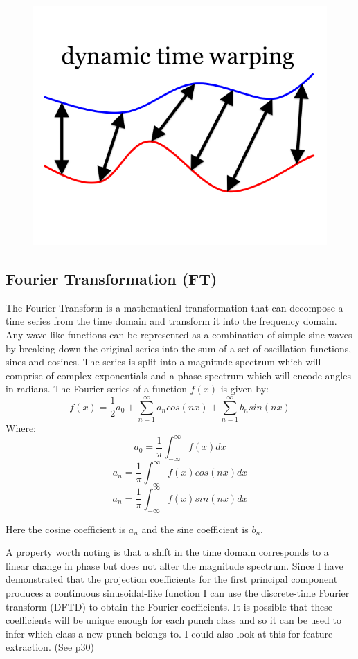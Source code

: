 \begin{figure}[h]
    \centering
    \includegraphics[height=0.25\textheight]{fig02/dtw}
    \label{fig:kinect}
\end{figure}


\subsection{Fourier Transformation (FT)}
The Fourier Transform is a mathematical transformation that can decompose a time series from the time domain and transform it into the frequency domain. Any wave-like functions can be represented as a combination of simple sine waves by breaking down the original series into the sum of a set of oscillation functions, sines and cosines. The series is split into a magnitude spectrum which will comprise of complex exponentials and a phase spectrum which will encode angles in radians. 
The Fourier series of a function $f(x)$ is given by:
$$f(x)=\frac{1}{2}a_0 + \sum_{n=1}^\infty a_n cos(nx) + \sum_{n=1}^\infty b_n sin(nx)$$
Where:
$$a_0 = \frac{1}{\pi}\int_{-\infty}^\infty f(x)dx$$
$$a_n = \frac{1}{\pi}\int_{-\infty}^\infty f(x)cos(nx)dx$$
$$a_n = \frac{1}{\pi}\int_{-\infty}^\infty f(x)sin(nx)dx$$

Here the cosine coefficient is $a_n$ and the sine coefficient is $b_n$.

A property worth noting is that a shift in the time domain corresponds to a linear change in phase but does not alter the magnitude spectrum. Since I have demonstrated that the projection coefficients for the first principal component produces a continuous sinusoidal-like function I can use the discrete-time Fourier transform (DFTD) to obtain the Fourier coefficients. It is possible that these coefficients will be unique enough for each punch class and so it can be used to infer which class a new punch belongs to. I could also look at this for feature extraction. (See p30)

